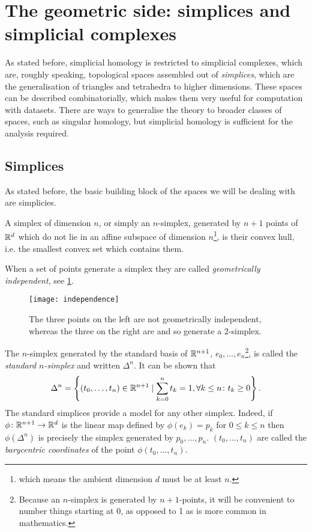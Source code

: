 \documentclass[../main.tex]{subfiles}
\begin{document}
\section{The geometric side: simplices and simplicial complexes}\label{sec:geometric side}
As stated before, simplicial homology is restricted to simplicial complexes, which are,
roughly speaking, topological spaces assembled out of \emph{simplices}, which are the
generalisation of triangles and tetrahedra to higher dimensions. These spaces can be
described combinatorially, which makes them very useful for computation with datasets.
There are ways to generalise the theory to broader classes of spaces, such as singular
homology, but simplicial homology is sufficient for the analysis required. 

\subsection{Simplices}
As stated before, the basic building block of the spaces we will be dealing with are
simplicies. 
\begin{definition}[Simplex]\label{def:simplex}
	A simplex of dimension \( n \), or simply an \( n \)-simplex, generated by \( n+1 \)
	points of \( \mathbb{R}^d \) which do not lie in an affine subspace of dimension \( n
	\)\footnote{which means the ambient dimension \( d \) must be at least \( n \).}, is
	their convex hull, i.e. the smallest convex set which contains them.
\end{definition}
When a set of points generate a simplex they are called \emph{geometrically independent},
see \cref{fig:independence}. 

\begin{figure}[htb]
	\centering
	\texttt{[image: independence]}
	\caption{The three points on the left are not geometrically independent, whereas the
	three on the right are and so generate a 2-simplex.}
	\label{fig:independence}
\end{figure}

The \( n \)-simplex generated by the standard basis of \( \mathbb{R}^{n+1} \), \( e_0,
\dots, e_n \)\footnote{Because an \( n \)-simplex is generated by \( n+1 \)-points, it
will be convenient to number things starting at 0, as opposed to 1 as is more
common in mathematics.}, is called the \emph{standard \( n \)-simplex} and
written \( \Delta^n \). It can be shown that
\begin{equation*}
	\Delta^n = \left\{ (t_0, \dots, t_n) \in \mathbb{R}^{n+1} \mid \sum_{k = 0}^{n} t_k = 1, \forall k
	\leq n \colon t_k \geq 0 \right\}. 
\end{equation*}
The standard simplices provide a model for any other simplex. Indeed, if \( \phi \colon
\mathbb{R}^{n+1} \to \mathbb{R}^d \) is the linear map defined by \( \phi(e_k) = p_k \) for \( 0 \leq k
\leq n \) then \( \phi(\Delta^n) \) is precisely the simplex generated by \( p_0, \dots,
p_n \). \( (t_0, \dots, t_n) \) are called the \emph{barycentric coordinates} of the point
\( \phi(t_0, \dots, t_n) \). 
\end{document}
